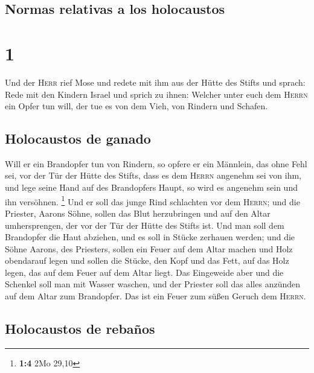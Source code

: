 \hypertarget{normas-relativas-a-los-holocaustos}{%
\subsection{Normas relativas a los
holocaustos}\label{normas-relativas-a-los-holocaustos}}

\hypertarget{section}{%
\section{1}\label{section}}

 Und der \textsc{Herr} rief Mose und redete mit ihm aus
der Hütte des Stifts und sprach:  Rede mit den Kindern
Israel und sprich zu ihnen: Welcher unter euch dem \textsc{Herrn} ein
Opfer tun will, der tue es von dem Vieh, von Rindern und Schafen.

\hypertarget{holocaustos-de-ganado}{%
\subsection{Holocaustos de ganado}\label{holocaustos-de-ganado}}

 Will er ein Brandopfer tun von Rindern, so opfere er ein
Männlein, das ohne Fehl sei, vor der Tür der Hütte des Stifts, dass es
dem \textsc{Herrn} angenehm sei von ihm,  und lege seine
Hand auf des Brandopfers Haupt, so wird es angenehm sein und ihn
versöhnen. \footnote{\textbf{1:4} 2Mo 29,10}  Und er soll
das junge Rind schlachten vor dem \textsc{Herrn}; und die Priester,
Aarons Söhne, sollen das Blut herzubringen und auf den Altar
umhersprengen, der vor der Tür der Hütte des Stifts ist. 
Und man soll dem Brandopfer die Haut abziehen, und es soll in Stücke
zerhauen werden;  und die Söhne Aarons, des Priesters,
sollen ein Feuer auf dem Altar machen und Holz obendarauf legen
 und sollen die Stücke, den Kopf und das Fett, auf das
Holz legen, das auf dem Feuer auf dem Altar liegt.  Das
Eingeweide aber und die Schenkel soll man mit Wasser waschen, und der
Priester soll das alles anzünden auf dem Altar zum Brandopfer. Das ist
ein Feuer zum süßen Geruch dem \textsc{Herrn}.

\hypertarget{holocaustos-de-rebauxf1os}{%
\subsection{Holocaustos de rebaños}\label{holocaustos-de-rebauxf1os}}

